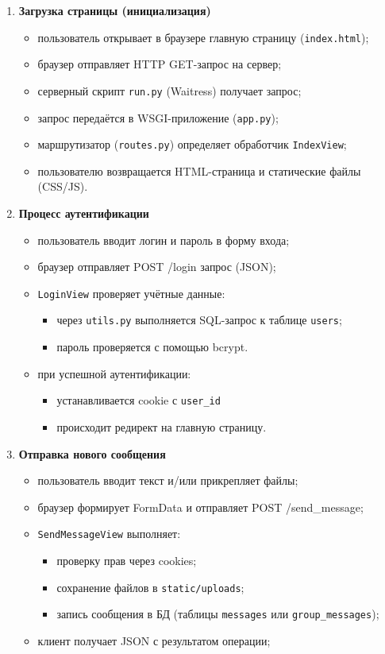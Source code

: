 \begin{enumerate}[leftmargin=*,label=\textbf{\arabic*.}]
	\item \textbf{Загрузка страницы (инициализация)}
	\begin{itemize}
		\item пользователь открывает в браузере главную страницу (\texttt{index.html});
		\item браузер отправляет HTTP GET-запрос на сервер;
		\item серверный скрипт \texttt{run.py} (Waitress) получает запрос;
		\item запрос передаётся в WSGI-приложение (\texttt{app.py});
		\item маршрутизатор (\texttt{routes.py}) определяет обработчик \texttt{IndexView};
		\item пользователю возвращается HTML-страница и статические файлы (CSS/JS).
	\end{itemize}
	
	\item \textbf{Процесс аутентификации}
	\begin{itemize}
		\item пользователь вводит логин и пароль в форму входа;
		\item браузер отправляет POST /login запрос (JSON);
		\item \texttt{LoginView} проверяет учётные данные:
		\begin{itemize}
			\item через \texttt{utils.py} выполняется SQL-запрос к таблице \texttt{users};
			\item пароль проверяется с помощью bcrypt.
		\end{itemize}
		\item при успешной аутентификации:
		\begin{itemize}
			\item устанавливается cookie с \texttt{user\_id}
			\item происходит редирект на главную страницу.
		\end{itemize}
	\end{itemize}
	
	\item \textbf{Отправка нового сообщения}
	\begin{itemize}
		\item пользователь вводит текст и/или прикрепляет файлы;
		\item браузер формирует FormData и отправляет POST /send\_message;
		\item \texttt{SendMessageView} выполняет:
		\begin{itemize}
			\item проверку прав через cookies;
			\item сохранение файлов в \texttt{static/uploads};
			\item запись сообщения в БД (таблицы \texttt{messages} или \texttt{group\_messages});
		\end{itemize}
		\item клиент получает JSON с результатом операции;
	\end{itemize}
	

\end{enumerate}
